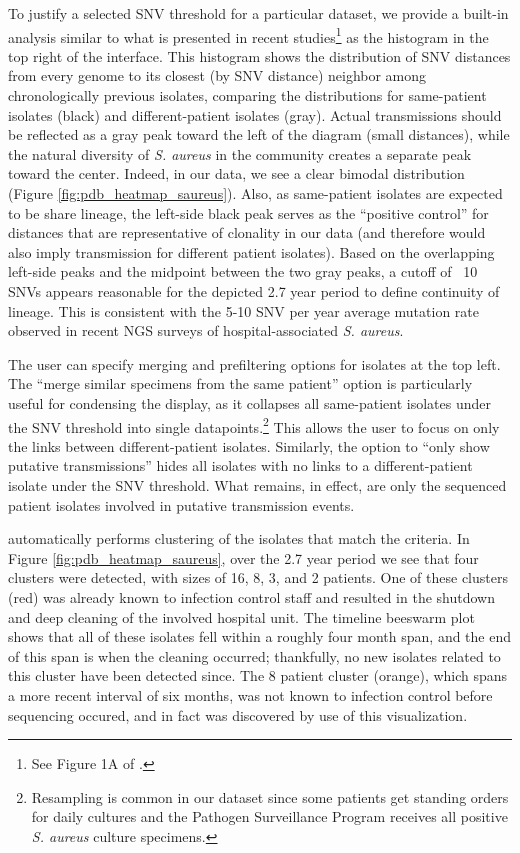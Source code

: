 To justify a selected SNV threshold for a particular dataset, we provide a built-in analysis similar to what is presented in recent studies\footnote{See Figure 1A of \textcite{Eyre2013}.} as the histogram in the top right of the interface. This histogram shows the distribution of SNV distances from every genome to its closest (by SNV distance) neighbor among chronologically previous isolates, comparing the distributions for same-patient isolates (black) and different-patient isolates (gray). Actual transmissions should be reflected as a gray peak toward the left of the diagram (small distances), while the natural diversity of \emph{S. aureus} in the community creates a separate peak toward the center. Indeed, in our data, we see a clear bimodal distribution (Figure \ref{fig:pdb_heatmap_saureus}). Also, as same-patient isolates are expected to be share lineage, the left-side black peak serves as the ``positive control'' for distances that are representative of clonality in our data (and therefore would also imply transmission for different patient isolates). Based on the overlapping left-side peaks and the midpoint between the two gray peaks, a cutoff of ~10 SNVs appears reasonable for the depicted 2.7 year period to define continuity of lineage. This is consistent with the 5-10 SNV per year average mutation rate observed in recent NGS surveys of hospital-associated \emph{S. aureus}.\autocite{Price2014,Harris2013}

The user can specify merging and prefiltering options for isolates at the top left. The ``merge similar specimens from the same patient'' option is particularly useful for condensing the display, as it collapses all same-patient isolates under the SNV threshold into single datapoints.\footnote{Resampling is common in our dataset since some patients get standing orders for daily cultures and the Pathogen Surveillance Program receives all positive \emph{S. aureus} culture specimens.} This allows the user to focus on only the links between different-patient isolates. Similarly, the option to ``only show putative transmissions'' hides all isolates with no links to a different-patient isolate under the SNV threshold. What remains, in effect, are only the sequenced patient isolates involved in putative transmission events.

\pathogendbviz{} automatically performs clustering of the isolates that match the criteria. In Figure \ref{fig:pdb_heatmap_saureus}, over the 2.7 year period we see that four clusters were detected, with sizes of 16, 8, 3, and 2 patients. One of these clusters (red) was already known to infection control staff and resulted in the shutdown and deep cleaning of the involved hospital unit. The timeline beeswarm plot shows that all of these isolates fell within a roughly four month span, and the end of this span is when the cleaning occurred; thankfully, no new isolates related to this cluster have been detected since. The 8 patient cluster (orange), which spans a more recent interval of six months, was not known to infection control before sequencing occured, and in fact was discovered by use of this visualization.


